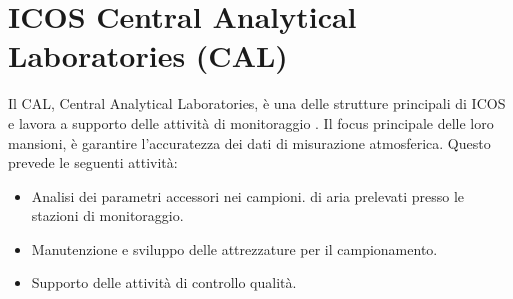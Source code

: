 \section{ICOS Central Analytical Laboratories (CAL)}
\label{section:CAL}
Il CAL, Central Analytical Laboratories, è una delle strutture
principali di ICOS e lavora a supporto delle attività di monitoraggio \cite{ICOSCentralAnalyticalLaboratories}.
Il focus principale delle loro mansioni, è garantire l'accuratezza
dei dati di misurazione atmosferica. Questo prevede le seguenti attività:
\begin{itemize}
    \item Analisi dei parametri accessori nei campioni.
    di aria prelevati presso le stazioni di monitoraggio.
    \item Manutenzione e sviluppo delle attrezzature per il campionamento.
    \item Supporto delle attività di controllo qualità.
\end{itemize}
